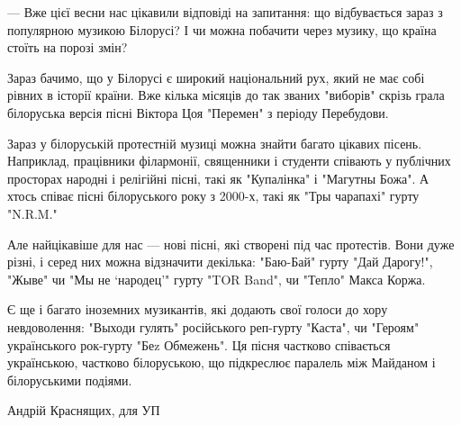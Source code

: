 — Вже цієї весни нас цікавили відповіді на запитання: що відбувається зараз з
популярною музикою Білорусі? І чи можна побачити через музику, що країна стоїть
на порозі змін? 

Зараз бачимо, що у Білорусі є широкий національний рух, який не має собі рівних
в історії країни. Вже кілька місяців до так званих "виборів" скрізь грала
білоруська версія пісні Віктора Цоя "Перемен" з періоду Перебудови.

Зараз у білоруській протестній музиці можна знайти багато цікавих пісень.
Наприклад, працівники філармонії, священники і студенти співають у публічних
просторах народні і релігійні пісні, такі як "Купалінка" і "Магутны Божа". А
хтось співає пісні білоруського року з 2000-х, такі як "Тры чарапахі" гурту
"N.R.M." 

Але найцікавіше для нас — нові пісні, які створені під час протестів. Вони дуже
різні, і серед них можна відзначити декілька: "Баю-Бай" гурту "Дай Дарогу!",
"Жыве" чи "Мы не ‘народец’" гурту "TOR Band", чи "Тепло" Макса Коржа. 

Є ще і багато іноземних музикантів, які додають свої голоси до хору
невдоволення: "Выходи гулять" російського реп-гурту "Каста", чи "Героям"
українського рок-гурту "Беz Обмежень". Ця пісня частково співається
українською, частково білоруською, що підкреслює паралель між Майданом і
білоруськими подіями. 

Андрій Краснящих, для УП

